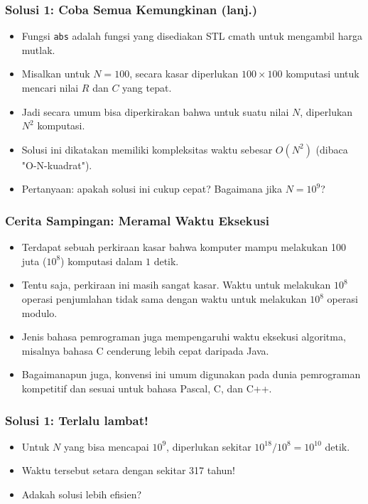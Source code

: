\begin{frame}[fragile]
\frametitle{Solusi 1: Coba Semua Kemungkinan (lanj.)}
\begin{itemize}
  \item Fungsi \texttt{abs} adalah fungsi yang disediakan STL cmath untuk mengambil harga mutlak.
  \item Misalkan untuk $N = 100$, secara kasar diperlukan $100 \times 100$ komputasi untuk mencari nilai $R$ dan $C$ yang tepat.
  \item Jadi secara umum bisa diperkirakan bahwa untuk suatu nilai $N$, diperlukan $N^2$ komputasi.
  \item Solusi ini dikatakan memiliki kompleksitas waktu sebesar $O(N^2)$ (dibaca "O-N-kuadrat").
  \item Pertanyaan: apakah solusi ini cukup cepat? Bagaimana jika $N = 10^9$?
\end{itemize}
\end{frame}

\begin{frame}
\frametitle{Cerita Sampingan: Meramal Waktu Eksekusi}
\begin{itemize}
  \item Terdapat sebuah perkiraan kasar bahwa komputer mampu melakukan 100 juta ($10^8$) komputasi dalam $1$ detik.
  \item Tentu saja, perkiraan ini masih sangat kasar. Waktu untuk melakukan $10^8$ operasi penjumlahan tidak sama dengan waktu untuk melakukan $10^8$ operasi modulo.
  \item Jenis bahasa pemrograman juga mempengaruhi waktu eksekusi algoritma, misalnya bahasa C cenderung lebih cepat daripada Java.
  \item Bagaimanapun juga, konvensi ini umum digunakan pada dunia pemrograman kompetitif dan sesuai untuk bahasa Pascal, C, dan C++.
\end{itemize}
\end{frame}

\begin{frame}
\frametitle{Solusi 1: Terlalu lambat!}
\begin{itemize}
  \item Untuk $N$ yang bisa mencapai $10^9$, diperlukan sekitar $10^{18}/10^8 = 10^{10}$ detik.
  \item Waktu tersebut setara dengan sekitar 317 tahun!
  \item Adakah solusi lebih efisien?
\end{itemize}
\end{frame}

